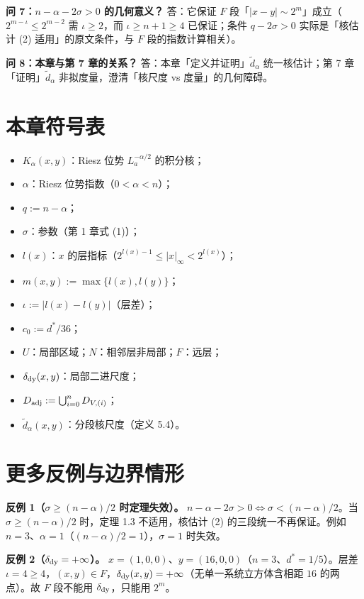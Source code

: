 \documentclass[a4paper,11pt,openany]{ctexbook}
\numberwithin{equation}{chapter}
\numberwithin{figure}{chapter}
\numberwithin{table}{chapter}
\begin{document}
\textbf{问 7：$n-\alpha-2\sigma>0$ 的几何意义？} 答：它保证 $F$ 段「$|x-y|\sim2^m$」成立（$2^{m-\iota}\le2^{m-2}$ 需 $\iota\ge2$，而 $\iota\ge n+1\ge4$ 已保证；条件 $q-2\sigma>0$ 实际是「核估计 (2) 适用」的原文条件，与 $F$ 段的指数计算相关）。

\textbf{问 8：本章与第 7 章的关系？} 答：本章「定义并证明」$\widetilde d_\alpha$ 统一核估计；第 7 章「证明」$\widetilde d_\alpha$ 非拟度量，澄清「核尺度 vs 度量」的几何障碍。

\section{本章符号表}

\begin{itemize}
\item $K_\alpha(x,y)$：Riesz 位势 $L_a^{-\alpha/2}$ 的积分核；
\item $\alpha$：Riesz 位势指数（$0<\alpha<n$）；
\item $q:=n-\alpha$；
\item $\sigma$：参数（第 1 章式 (1)）；
\item $l(x)$：$x$ 的层指标（$2^{l(x)-1}\le|x|_\infty<2^{l(x)}$）；
\item $m(x,y):=\max\{l(x),l(y)\}$；
\item $\iota:=|l(x)-l(y)|$（层差）；
\item $c_0:=d^*/36$；
\item $U$：局部区域；$N$：相邻层非局部；$F$：远层；
\item $\delta_{\rm dy}(x,y)$：局部二进尺度；
\item $D_{\rm adj}:=\bigcup_{i=0}^nD_{V,(i)}$；
\item $\widetilde d_\alpha(x,y)$：分段核尺度（定义 5.4）。
\end{itemize}

\section{更多反例与边界情形}

\textbf{反例 1（$\sigma\ge(n-\alpha)/2$ 时定理失效）。} $n-\alpha-2\sigma>0\iff\sigma<(n-\alpha)/2$。当 $\sigma\ge(n-\alpha)/2$ 时，定理 1.3 不适用，核估计 (2) 的三段统一不再保证。例如 $n=3$、$\alpha=1$（$(n-\alpha)/2=1$），$\sigma=1$ 时失效。

\textbf{反例 2（$\delta_{\rm dy}=+\infty$）。} $x=(1,0,0)$、$y=(16,0,0)$（$n=3$、$d^*=1/5$）。层差 $\iota=4\ge4$，$(x,y)\in F$，$\delta_{\rm dy}(x,y)=+\infty$（无单一系统立方体含相距 $16$ 的两点）。故 $F$ 段不能用 $\delta_{\rm dy}$，只能用 $2^m$。
\end{document}
